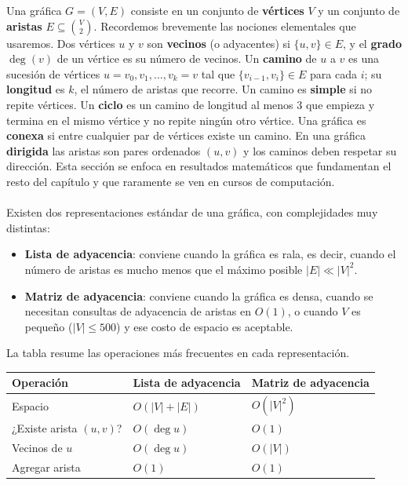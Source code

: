 Una gráfica $G = (V, E)$ consiste en un conjunto de \textbf{vértices} $V$ y un conjunto de \textbf{aristas} $E \subseteq \binom{V}{2}$. Recordemos brevemente las nociones elementales que usaremos. Dos vértices $u$ y $v$ son \textbf{vecinos} (o adyacentes) si $\{u,v\}\in E$, y el \textbf{grado} $\deg(v)$ de un vértice es su número de vecinos. Un \textbf{camino} de $u$ a $v$ es una sucesión de vértices $u=v_0, v_1, \dots, v_k=v$ tal que $\{v_{i-1},v_i\}\in E$ para cada $i$; su \textbf{longitud} es $k$, el número de aristas que recorre. Un camino es \textbf{simple} si no repite vértices. Un \textbf{ciclo} es un camino de longitud al menos $3$ que empieza y termina en el mismo vértice y no repite ningún otro vértice. Una gráfica es \textbf{conexa} si entre cualquier par de vértices existe un camino. En una gráfica \textbf{dirigida} las aristas son pares ordenados $(u,v)$ y los caminos deben respetar su dirección. Esta sección se enfoca en resultados matemáticos que fundamentan el resto del capítulo y que raramente se ven en cursos de computación.
\\\\
Existen dos representaciones estándar de una gráfica, con complejidades muy distintas:
\begin{itemize}
    \item \textbf{Lista de adyacencia}: conviene cuando la gráfica es rala, es decir, cuando el número de aristas es mucho menos que el máximo posible $|E| \ll |V|^2$.
    \item \textbf{Matriz de adyacencia}: conviene cuando la gráfica es densa, cuando se necesitan consultas de adyacencia de aristas en $O(1)$, o cuando $V$ es pequeño ($|V| \leq 500$) y ese costo de espacio es aceptable.
\end{itemize}
La tabla resume las operaciones más frecuentes en cada representación.

\begin{table}[H]
\centering
\renewcommand{\arraystretch}{1.4}
\begin{tabular}{lll}
\toprule
\textbf{Operación} & \textbf{Lista de adyacencia} & \textbf{Matriz de adyacencia} \\
\midrule
Espacio                    & $O(|V| + |E|)$  & $O(|V|^2)$ \\
¿Existe arista $(u,v)$?    & $O(\deg u)$ & $O(1)$ \\
Vecinos de $u$             & $O(\deg u)$ & $O(|V|)$ \\
Agregar arista             & $O(1)$      & $O(1)$ \\
\bottomrule
\end{tabular}
\end{table}
